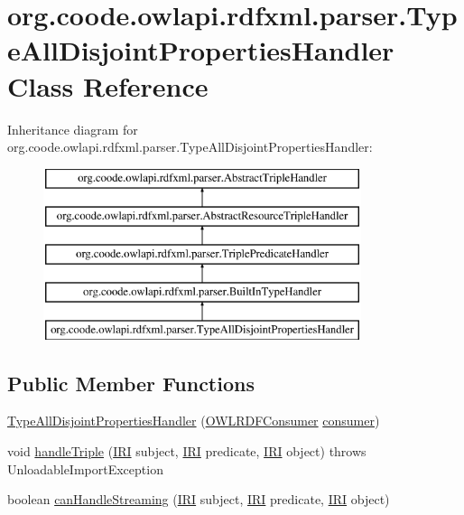 \hypertarget{classorg_1_1coode_1_1owlapi_1_1rdfxml_1_1parser_1_1_type_all_disjoint_properties_handler}{\section{org.\-coode.\-owlapi.\-rdfxml.\-parser.\-Type\-All\-Disjoint\-Properties\-Handler Class Reference}
\label{classorg_1_1coode_1_1owlapi_1_1rdfxml_1_1parser_1_1_type_all_disjoint_properties_handler}
}
Inheritance diagram for org.\-coode.\-owlapi.\-rdfxml.\-parser.\-Type\-All\-Disjoint\-Properties\-Handler\-:\begin{figure}[H]
\begin{center}
\leavevmode
\includegraphics[height=5.000000cm]{classorg_1_1coode_1_1owlapi_1_1rdfxml_1_1parser_1_1_type_all_disjoint_properties_handler}
\end{center}
\end{figure}
\subsection*{Public Member Functions}
\begin{DoxyCompactItemize}
\item 
\hyperlink{classorg_1_1coode_1_1owlapi_1_1rdfxml_1_1parser_1_1_type_all_disjoint_properties_handler_a40871c913a4f1cd65842d8714d1fc0e2}{Type\-All\-Disjoint\-Properties\-Handler} (\hyperlink{classorg_1_1coode_1_1owlapi_1_1rdfxml_1_1parser_1_1_o_w_l_r_d_f_consumer}{O\-W\-L\-R\-D\-F\-Consumer} \hyperlink{classorg_1_1coode_1_1owlapi_1_1rdfxml_1_1parser_1_1_abstract_triple_handler_a4ccf4d898ff01eb1cadfa04b23d54e9c}{consumer})
\item 
void \hyperlink{classorg_1_1coode_1_1owlapi_1_1rdfxml_1_1parser_1_1_type_all_disjoint_properties_handler_a5b56f9777d43795053ae839ee960a45f}{handle\-Triple} (\hyperlink{classorg_1_1semanticweb_1_1owlapi_1_1model_1_1_i_r_i}{I\-R\-I} subject, \hyperlink{classorg_1_1semanticweb_1_1owlapi_1_1model_1_1_i_r_i}{I\-R\-I} predicate, \hyperlink{classorg_1_1semanticweb_1_1owlapi_1_1model_1_1_i_r_i}{I\-R\-I} object)  throws Unloadable\-Import\-Exception 
\item 
boolean \hyperlink{classorg_1_1coode_1_1owlapi_1_1rdfxml_1_1parser_1_1_type_all_disjoint_properties_handler_af0f7580a136723645c203fdf75357532}{can\-Handle\-Streaming} (\hyperlink{classorg_1_1semanticweb_1_1owlapi_1_1model_1_1_i_r_i}{I\-R\-I} subject, \hyperlink{classorg_1_1semanticweb_1_1owlapi_1_1model_1_1_i_r_i}{I\-R\-I} predicate, \hyperlink{classorg_1_1semanticweb_1_1owlapi_1_1model_1_1_i_r_i}{I\-R\-I} object)
\end{DoxyCompactItemize}
